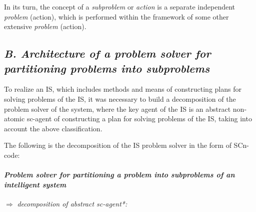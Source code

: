 \documentclass[a4paper, 10pt,]{article}
\begin{document}
In its turn, the concept of a \textit{subproblem} or \textit{action}
is a separate independent \textit{problem} (action), which is
performed within the framework of some other extensive
\textit{problem} (action).

\subsection*{\textit{B. Architecture of a problem solver for partitioning problems into subproblems}}
To realize an IS, which includes methods and means
of constructing plans for solving problems of the IS, it
was necessary to build a decomposition of the problem
solver of the system, where the key agent of the IS is an
abstract non-atomic sc-agent of constructing a plan for
solving problems of the IS, taking into account the above
classification.

The following is the decomposition of the IS problem
solver in the form of SCn-code:
\paragraph{\textbf{\textit{Problem solver for partitioning a problem into
subproblems of an intelligent system}}}

\hfill\break${\Rightarrow}$
\textit{decomposition of abstract sc-agent*:}
\end{document}
